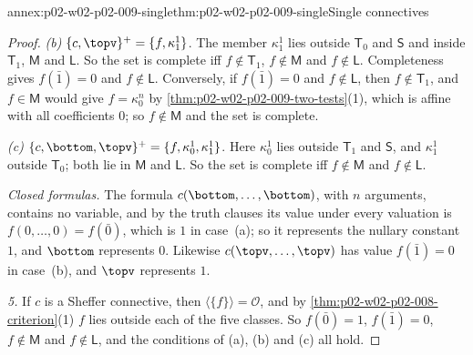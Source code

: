 \begin{annexitem}{annex:p02-w02-p02-009-single}{thm:p02-w02-p02-009-single}{Single connectives}
\begin{proof}
\emph{(b)}  \(\{c,\topv\}^+=\{f,\kappa^1_1\}\).  The member \(\kappa^1_1\)
lies outside \(\mathsf T_0\) and \(\mathsf S\) and inside \(\mathsf T_1\),
\(\mathsf M\) and \(\mathsf L\).  So the set is complete iff
\(f\notin\mathsf T_1\), \(f\notin\mathsf M\) and \(f\notin\mathsf L\).
Completeness gives \(f(\bar1)=0\) and \(f\notin\mathsf L\).  Conversely, if
\(f(\bar1)=0\) and \(f\notin\mathsf L\), then \(f\notin\mathsf T_1\), and
\(f\in\mathsf M\) would give \(f=\kappa^n_0\) by
\cref{thm:p02-w02-p02-009-two-tests}(1), which is affine with all
coefficients \(0\); so \(f\notin\mathsf M\) and the set is complete.

\emph{(c)}  \(\{c,\bottom,\topv\}^+=\{f,\kappa^1_0,\kappa^1_1\}\).  Here
\(\kappa^1_0\) lies outside \(\mathsf T_1\) and \(\mathsf S\), and
\(\kappa^1_1\) outside \(\mathsf T_0\); both lie in \(\mathsf M\) and
\(\mathsf L\).  So the set is complete iff \(f\notin\mathsf M\) and
\(f\notin\mathsf L\).

\emph{Closed formulas.}  The formula \(c(\bottom,\ldots,\bottom)\), with
\(n\) arguments, contains no variable, and by the truth clauses its value
under every valuation is \(f(0,\ldots,0)=f(\bar0)\), which is \(1\) in
case~(a); so it represents the nullary constant \(1\), and \(\bottom\)
represents \(0\).  Likewise \(c(\topv,\ldots,\topv)\) has value
\(f(\bar1)=0\) in case~(b), and \(\topv\) represents \(1\).

\emph{5.}  If \(c\) is a Sheffer connective, then
\(\langle\{f\}\rangle=\mathcal O\), and by
\cref{thm:p02-w02-p02-008-criterion}(1) \(f\) lies outside each of the five
classes.  So \(f(\bar0)=1\), \(f(\bar1)=0\), \(f\notin\mathsf M\) and
\(f\notin\mathsf L\), and the conditions of (a), (b) and (c) all hold.
\end{proof}
\end{annexitem}

